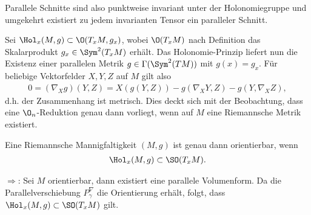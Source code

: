 \documentclass[%
	paper=a5,%
	fleqn,%
	DIV=18,%
	BCOR=0mm,
	fontsize=11pt,
	titlepage=false,%
	bibliography=totoc,
	DIV=18,%
	twoside=true,
	pdftitle=Riemannsche Geometrie,
	pdfauthor=Uwe Semmelmann,
	numbers=noendperiod]%
	{scrbook}
\begin{document}
Parallele Schnitte sind also punktweise invariant unter der Holonomiegruppe und umgekehrt existiert zu jedem invarianten Tensor ein paralleler Schnitt.

\begin{ex}
\begin{exenum}
\item Sei $\Hol_{x}(M,g) \subset \O(T_{x}M,g_{x})$, wobei
$\O(T_{x}M)$ nach Definition das Skalarprodukt $g_{x}\in \Sym^2(T_{x}M)$ erhält. Das Holonomie-Prinzip liefert nun die Existenz einer parallelen Metrik $g\in \Gamma(\Sym^2(TM))$ mit $g(x) = g_{x}$. Für beliebige Vektorfelder $X,Y,Z$ auf $M$ gilt also
\begin{align*}
0 = (\nabla_{X}g)(Y,Z) = X(g(Y,Z)) - g(\nabla_{X}Y,Z) - g(Y,\nabla_{X}Z),
\end{align*}
d.h. der Zusammenhang ist metrisch. Dies deckt sich mit der Beobachtung, dass eine $\O_{n}$-Reduktion genau dann vorliegt, wenn auf $M$ eine Riemannsche Metrik existiert.
\item Eine Riemannsche Mannigfaltigkeit $(M,g)$ ist genau dann orientierbar, wenn
\begin{align*}
\Hol_{x}(M,g) \subset \SO(T_{x}M).
\end{align*}

$\Rightarrow$: Sei $M$ orientierbar, dann existiert eine parallele Volumenform. Da die Parallelverschiebung $P_{\gamma}^\nabla$ die Orientierung erhält, folgt, dass $\Hol_{x}(M,g)\subset \SO(T_{x}M)$ gilt.


\end{exenum}
\end{ex}
\end{document}
